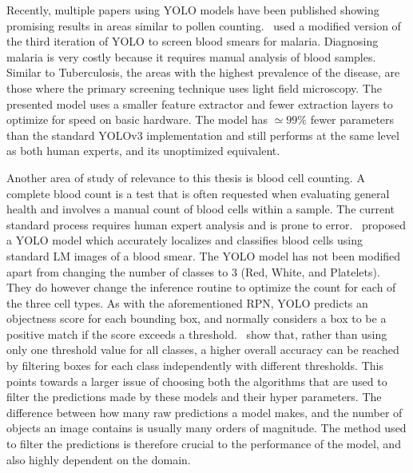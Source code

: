 Recently, multiple papers using YOLO models have been published showing promising results in areas similar to pollen counting.\ \textcite{chibuta_real_time_2020} used a modified version of the third iteration of YOLO to screen blood smears for malaria.
Diagnosing malaria is very costly because it requires manual analysis of blood samples.
Similar to Tuberculosis, the areas with the highest prevalence of the disease, are those where the primary screening technique uses light field microscopy.
The presented model uses a smaller feature extractor and fewer extraction layers to optimize for speed on basic hardware.
The model has \( \simeq 99\% \) fewer parameters than the standard YOLOv3 implementation and still performs at the same level as both human experts, and its unoptimized equivalent.

Another area of study of relevance to this thesis is blood cell counting.
A complete blood count is a test that is often requested when evaluating general health and involves a manual count of blood cells within a sample.
The current standard process requires human expert analysis and is prone to error.\ \textcite{islam_machine_2019} proposed a YOLO model which accurately localizes and classifies blood cells using standard LM images of a blood smear.
The YOLO model has not been modified apart from changing the number of classes to 3 (Red, White, and Platelets).
They do however change the inference routine to optimize the count for each of the three cell types.
As with the aforementioned RPN, YOLO predicts an objectness score for each bounding box, and normally considers a box to be a positive match if the score exceeds a threshold.\ \citeauthor{islam_machine_2019} show that, rather than using only one threshold value for all classes, a higher overall accuracy can be reached by filtering boxes for each class independently with different thresholds.
This points towards a larger issue of choosing both the algorithms that are used to filter the predictions made by these models and their hyper parameters.
The difference between how many raw predictions a model makes, and the number of objects an image contains is usually many orders of magnitude.
The method used to filter the predictions is therefore crucial to the performance of the model, and also highly dependent on the domain.


